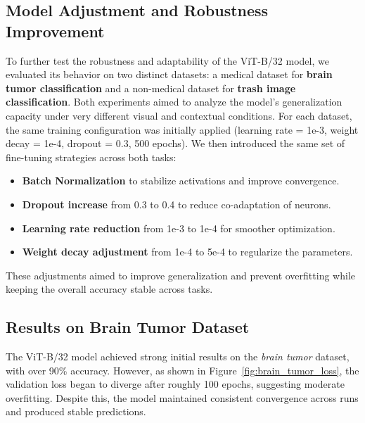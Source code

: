 \documentclass[12pt]{article}
\begin{document}
\subsection{Model Adjustment and Robustness Improvement}

To further test the robustness and adaptability of the ViT-B/32 model, we evaluated its behavior on two distinct datasets: 
a medical dataset for \textbf{brain tumor classification} and a non-medical dataset for \textbf{trash image classification}. 
Both experiments aimed to analyze the model’s generalization capacity under very different visual and contextual conditions.
For each dataset, the same training configuration was initially applied (learning rate = 1e-3, weight decay = 1e-4, dropout = 0.3, 500 epochs). 
We then introduced the same set of fine-tuning strategies across both tasks:

\begin{itemize}
    \item \textbf{Batch Normalization} to stabilize activations and improve convergence.
    \item \textbf{Dropout increase} from 0.3 to 0.4 to reduce co-adaptation of neurons.
    \item \textbf{Learning rate reduction} from 1e-3 to 1e-4 for smoother optimization.
    \item \textbf{Weight decay adjustment} from 1e-4 to 5e-4 to regularize the parameters.
\end{itemize}

These adjustments aimed to improve generalization and prevent overfitting while keeping the overall accuracy stable across tasks.

\subsection{Results on Brain Tumor Dataset}

The ViT-B/32 model achieved strong initial results on the \textit{brain tumor} dataset, 
with over 90\% accuracy. However, as shown in Figure~\ref{fig:brain_tumor_loss}, 
the validation loss began to diverge after roughly 100 epochs, suggesting moderate overfitting. 
Despite this, the model maintained consistent convergence across runs and produced stable predictions.
\end{document}
